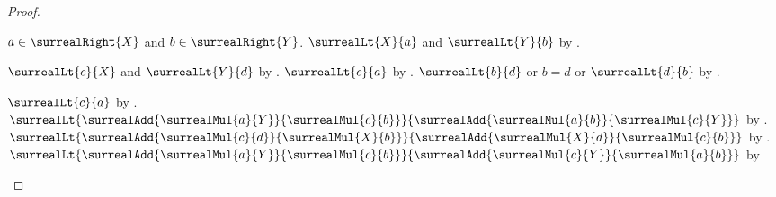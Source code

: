 \begin{proof}
\begin{subproof}
\begin{byCase}
\begin{byCase}
\begin{byCase}
\begin{byCase}
                                \end{byCase}
                        \end{byCase}
                \end{byCase}
                $a\in\surrealRight{X}$ and
                    $b\in\surrealRight{Y}$.
                $\surrealLt{X}{a}$ and $\surrealLt{Y}{b}$
                    by .
                \begin{byCase}
                        $\surrealLt{c}{X}$ and $\surrealLt{Y}{d}$
                            by .
                        $\surrealLt{c}{a}$
                            by .
                        $\surrealLt{b}{d}$ or $b=d$ or
                            $\surrealLt{d}{b}$
                            by .
                        \begin{byCase}
                                $\surrealLt{c}{a}$
                                    by .
                                $\surrealLt
                                    {\surrealAdd{\surrealMul{a}{Y}}
                                        {\surrealMul{c}{b}}}
                                    {\surrealAdd{\surrealMul{a}{b}}
                                        {\surrealMul{c}{Y}}}$
                                    by
                                    .
                                $\surrealLt
                                    {\surrealAdd{\surrealMul{c}{d}}
                                        {\surrealMul{X}{b}}}
                                    {\surrealAdd{\surrealMul{X}{d}}
                                        {\surrealMul{c}{b}}}$
                                    by
                                    .
                                $\surrealLt
                                    {\surrealAdd{\surrealMul{a}{Y}}
                                        {\surrealMul{c}{b}}}
                                    {\surrealAdd{\surrealMul{c}{Y}}
                                        {\surrealMul{a}{b}}}$
                                    by

\end{byCase}
\end{byCase}
\end{byCase}
\end{subproof}
\end{proof}
